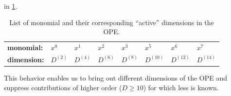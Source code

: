 \documentclass[../../index.tex]{subfiles}
\begin{document}
in \cref{table:monomialDimensions}.
\begin{table}
  \centering
  \begin{tabular}{l|lllllll}
    \toprule
    \textbf{monomial:} & $x^0$ & $x^1$ & $x^2$ & $x^3$ & $x^5$ & $x^6$ & $x^7$\\
    \textbf{dimension:} & $D^{(2)}$ & $D^{(4)}$ & $D^{(6)}$ & $D^{(8)}$ & $D^{(10)}$ & $D^{(12)}$ & $D^{(14)}$\\
    \bottomrule 
  \end{tabular}
  \caption{List of monomial and their corresponding ``active'' dimensions in the OPE.}
  \label{table:monomialDimensions}
\end{table}
This behavior enables us to bring out different dimensions of the OPE and
suppress contributions of higher order ($D\geq10$) for which less is known. 
\end{document}
